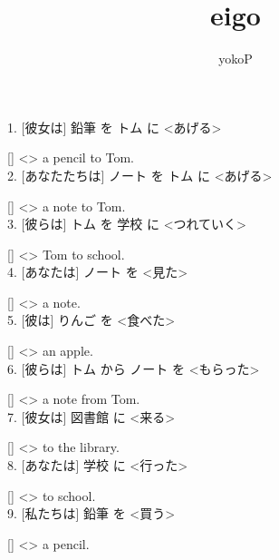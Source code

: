 \documentclass[uplatex,
paper=a4,
fontsize=18pt,
jafontsize=16pt,
number_of_lines=30,
line_length=30zh,
baselineskip=25pt,
]{jlreq}
\author{yokoP}
\title{eigo}
\begin{document}
1.  [彼女は] 鉛筆 を トム に <あげる>

  [\hspace{3em}] <\hspace{3em}> a pencil to Tom.
\\

2.  [あなたたちは] ノート を トム に <あげる>

  [\hspace{3em}] <\hspace{3em}> a note to Tom.
\\

3.  [彼らは] トム を 学校 に <つれていく>

  [\hspace{3em}] <\hspace{3em}> Tom to school.
\\

4.  [あなたは] ノート を <見た>

  [\hspace{3em}] <\hspace{3em}> a note.
\\

5.  [彼は] りんご を <食べた>

  [\hspace{3em}] <\hspace{3em}> an apple.
\\

6.  [彼らは] トム から ノート を <もらった>

  [\hspace{3em}] <\hspace{3em}> a note from Tom.
\\

7.  [彼女は] 図書館 に <来る>

  [\hspace{3em}] <\hspace{3em}> to the library.
\\

8.  [あなたは] 学校 に <行った>

  [\hspace{3em}] <\hspace{3em}> to school.
\\

9.  [私たちは] 鉛筆 を <買う>

  [\hspace{3em}] <\hspace{3em}> a pencil.
\\
\end{document}
